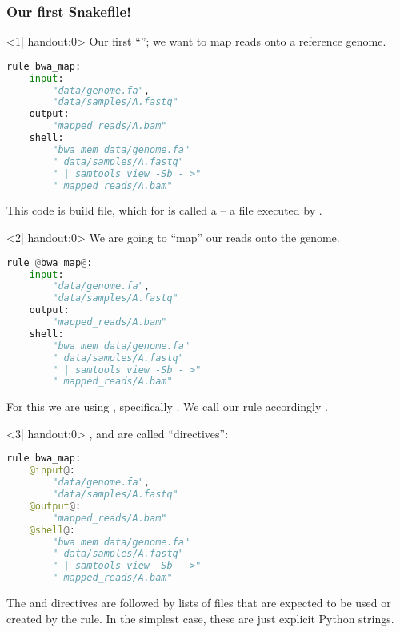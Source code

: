\begin{frame}[fragile]
  \frametitle{Our first Snakefile!}
  \begin{onlyenv}<1| handout:0>
    Our first ``''; we want to map reads onto a reference genome. 
    \begin{lstlisting}[language=Python,style=Python]
rule bwa_map:
    input:
        "data/genome.fa",
        "data/samples/A.fastq"
    output:
        "mapped_reads/A.bam"
    shell:
        "bwa mem data/genome.fa"
        " data/samples/A.fastq"
        " | samtools view -Sb - >"
        " mapped_reads/A.bam"
    \end{lstlisting}
    \begin{docs}
    	This code is build file, which for \Snakemake{} is called a  -- a file executed by \Snakemake{}.
    \end{docs}
    \end{onlyenv}
  \begin{onlyenv}<2| handout:0>
   We are going to ``map'' our reads onto the genome.
   \begin{lstlisting}[language=Python,style=Python]
rule @bwa_map@:
    input:
        "data/genome.fa",
        "data/samples/A.fastq"
    output:
        "mapped_reads/A.bam"
    shell:
        "bwa mem data/genome.fa"
        " data/samples/A.fastq"
        " | samtools view -Sb - >"
        " mapped_reads/A.bam"
    \end{lstlisting}
    For this we are using , specifically . We call our rule accordingly .
  \end{onlyenv}
  \begin{onlyenv}<3| handout:0>
   ,  and  are called ``directives'':
   \begin{lstlisting}[language=Python,style=Python]
rule bwa_map:
    @input@:
        "data/genome.fa",
        "data/samples/A.fastq"
    @output@:
        "mapped_reads/A.bam"
    @shell@:
        "bwa mem data/genome.fa"
        " data/samples/A.fastq"
        " | samtools view -Sb - >"
        " mapped_reads/A.bam"
    \end{lstlisting}
    The  and  directives are followed by lists of files that are expected to be used or created by the rule. In the simplest case, these are just explicit Python strings.
  \end{onlyenv}

\end{frame}
